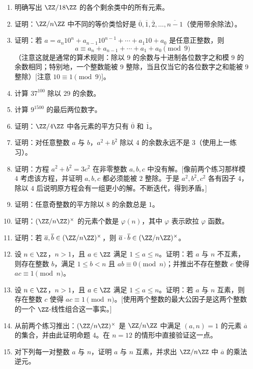 \begin{enumerate}[label=\arabic*.]
  \item 明确写出 $\ZZ/18\ZZ$ 的各个剩余类中的所有元素。
  \item 证明：$\ZZ/n\ZZ$ 中不同的等价类恰好是 $\overline{0},\overline{1},\overline{2},\ldots,\overline{n-1}$（使用带余除法）。
  \item 证明：若 $a=a_n10^n+a_{n-1}10^{n-1}+\cdots+a_1 10+a_0$ 是任意正整数，则
  \[
    a\equiv a_n+a_{n-1}+\cdots+a_1+a_0\pmod 9
  \]
  （注意这就是通常的算术规则：除以 $9$ 的余数与十进制各位数字之和模 $9$ 的余数相同；特别地，一个整数能被 $9$ 整除，当且仅当它的各位数字之和能被 $9$ 整除）[注意 $10\equiv1\pmod9$]。
  \item 计算 $37^{100}$ 除以 $29$ 的余数。
  \item 计算 $9^{1500}$ 的最后两位数字。
  \item 证明：$\ZZ/4\ZZ$ 中各元素的平方只有 $\overline{0}$ 和 $\overline{1}$。
  \item 证明：对任意整数 $a$ 与 $b$，$a^2+b^2$ 除以 $4$ 的余数永远不是 $3$（使用上一练习）。
  \item 证明：方程 $a^2+b^2=3c^2$ 在非零整数 $a,b,c$ 中没有解。[像前两个练习那样模 $4$ 考虑该方程，并证明 $a,b,c$ 都必须能被 $2$ 整除。于是 $a^2,b^2,c^2$ 各有因子 $4$，除以 $4$ 后说明原方程会有一组更小的解。不断迭代，得到矛盾。]
  \item 证明：任意奇整数的平方除以 $8$ 的余数总是 $1$。
  \item 证明：$(\ZZ/n\ZZ)^\times$ 的元素个数是 $\varphi(n)$，其中 $\varphi$ 表示欧拉 $\varphi$ 函数。
  \item 证明：若 $\overline{a},\overline{b}\in(\ZZ/n\ZZ)^\times$，则 $\overline{a}\cdot\overline{b}\in(\ZZ/n\ZZ)^\times$。
  \item 设 $n\in\ZZ$，$n>1$，且 $a\in\ZZ$ 满足 $1\leq a\leq n$。证明：若 $a$ 与 $n$ 不互素，则存在整数 $b$，满足 $1\leq b<n$ 且 $ab\equiv0\pmod n$；并推出不存在整数 $c$ 使得 $ac\equiv1\pmod n$。
  \item 设 $n\in\ZZ$，$n>1$，且 $a\in\ZZ$ 满足 $1\leq a\leq n$。证明：若 $a$ 与 $n$ 互素，则存在整数 $c$ 使得 $ac\equiv1\pmod n$。[使用两个整数的最大公因子是这两个整数的一个 $\ZZ$-线性组合这一事实。]
  \item 从前两个练习推出：$(\ZZ/n\ZZ)^\times$ 是 $\ZZ/n\ZZ$ 中满足 $(a,n)=1$ 的元素 $\overline{a}$ 的集合，并由此证明命题 4。在 $n=12$ 的情形中直接验证这一点。
  \item 对下列每一对整数 $a$ 与 $n$，证明 $a$ 与 $n$ 互素，并求出 $\ZZ/n\ZZ$ 中 $\overline{a}$ 的乘法逆元。

\end{enumerate}
